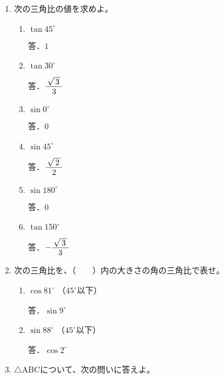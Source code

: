 \documentclass[b4paper,twocolumn]{jsarticle}
\def\nfrac#1#2{%
\displaystyle \frac{\lower.44ex\hbox{$\,#1\,$}}{\lower-.1ex\hbox{$\,#2\,$}}}%
\begin{document}
\newpage


\begin{enumerate}
\item 次の三角比の値を求めよ。

\begin{enumerate}
\item $\tan 45^\circ $
\vfill

\hfill 答．$1$

\item $\tan 30^\circ $
\vfill

\hfill 答．$\nfrac{\sqrt{\,3\,}}{3}$

\item $\sin 0^\circ $
\vfill

\hfill 答．$0$

\item $\sin 45^\circ $
\vfill

\hfill 答．$\nfrac{\sqrt{\,2\,}}{2}$

\item $\sin 180^\circ $
\vfill

\hfill 答．$0$

\item $\tan 150^\circ $
\vfill

\hfill 答．$-\nfrac{\sqrt{\,3\,}}{3}$

\end{enumerate}

\item 次の三角比を、（　　）内の大きさの角の三角比で表せ。

\begin{enumerate}
\item $\cos 81^\circ$ \hfill （$45^\circ$以下） \hspace{30truemm}
\vfill

\hfill 答．$\sin 9^\circ$

\item $\sin 88^\circ$ \hfill （$45^\circ$以下） \hspace{30truemm}
\vfill

\hfill 答．$\cos 2^\circ$

\end{enumerate}

\newpage
\item $\triangle$ABCについて、次の問いに答えよ。


\end{enumerate}
\end{document}
